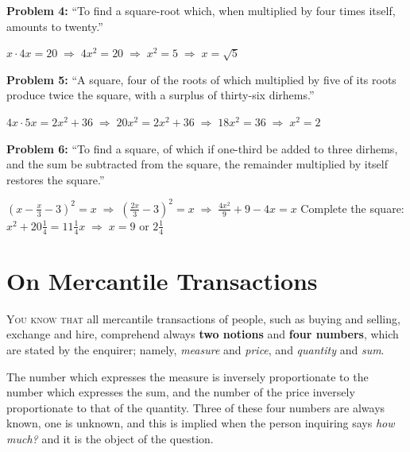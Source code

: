 \documentclass[11pt,a4paper,openany,oneside]{book}
\begin{document}
\textbf{Problem 4:} ``To find a square-root which, when multiplied by
four times itself, amounts to twenty.''

\begin{mathbox}
$x \cdot 4x = 20 \;\Rightarrow\; 4x^2 = 20 \;\Rightarrow\; x^2 = 5 \;\Rightarrow\; x = \sqrt{5}$
\end{mathbox}

\textbf{Problem 5:} ``A square, four of the roots of which multiplied by
five of its roots produce twice the square, with a surplus of thirty-six
dirhems.''

\begin{mathbox}
$4x \cdot 5x = 2x^2 + 36 \;\Rightarrow\; 20x^2 = 2x^2 + 36 \;\Rightarrow\; 18x^2 = 36 \;\Rightarrow\; x^2 = 2$
\end{mathbox}

\textbf{Problem 6:} ``To find a square, of which if one-third be added to
three dirhems, and the sum be subtracted from the square, the remainder
multiplied by itself restores the square.''

\begin{mathbox}
$\left(x - \tfrac{x}{3} - 3\right)^2 = x \;\Rightarrow\; \left(\tfrac{2x}{3} - 3\right)^2 = x
\;\Rightarrow\; \tfrac{4x^2}{9} + 9 - 4x = x$
Complete the square: $x^2 + 20\tfrac{1}{4} = 11\tfrac{1}{4}x \;\Rightarrow\; x = 9 \text{ or } 2\tfrac{1}{4}$
\end{mathbox}

\newpage


\chapter{On Mercantile Transactions}
\label{ch:mercantile}

\lettrine[lines=3, lhang=0.33, nindent=0em, findent=3pt]{
\textcolor{dropgold}{Y}}{ou know that} all mercantile transactions of people, such as buying and
selling, exchange and hire, comprehend always \textbf{two notions} and
\textbf{four numbers}, which are stated by the enquirer; namely,
\textit{measure} and \textit{price}, and \textit{quantity} and \textit{sum}.

The number which expresses the measure is inversely proportionate to the
number which expresses the sum, and the number of the price inversely
proportionate to that of the quantity. Three of these four numbers are
always known, one is unknown, and this is implied when the person inquiring
says \textit{how much?} and it is the object of the question.
\end{document}
